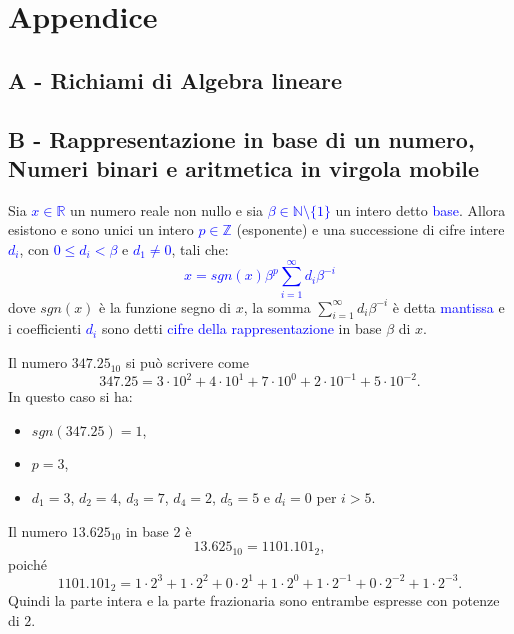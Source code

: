 \chapter*{Appendice}
{}

\section*{\textbf{A -} Richiami di Algebra lineare}

\section*{\textbf{B -} Rappresentazione in base di un numero, Numeri binari e aritmetica in virgola mobile}

\begin{defi}
Sia \textcolor{blue}{$x \in \mathbb{R}$} un numero reale non nullo e sia \textcolor{blue}{$\beta \in \mathbb{N}\setminus\{1\}$} un intero detto \textcolor{blue}{base}.
Allora esistono e sono unici un intero \textcolor{blue}{$p \in \mathbb{Z}$} (esponente) e una successione di cifre intere \textcolor{blue}{$d_i$},
con \textcolor{blue}{$0 \leq d_i < \beta$} e \textcolor{blue}{$d_1 \neq 0$}, tali che:
\textcolor{blue}{\[
x = sgn(x) \beta^p \sum_{i=1}^{\infty} d_i \beta^{-i}
\]}
dove $sgn(x)$ è la funzione segno di $x$, la somma $\sum_{i=1}^{\infty} d_i \beta^{-i}$ è detta 
\textcolor{blue}{mantissa} e i coefficienti \textcolor{blue}{$d_i$} sono detti
\textcolor{blue}{cifre della rappresentazione} in base $\beta$ di $x$.
\end{defi}

\begin{example}
Il numero $347.25_{10}$ si può scrivere come
\[
347.25 = 3 \cdot 10^2 + 4 \cdot 10^1 + 7 \cdot 10^0 + 2 \cdot 10^{-1} + 5 \cdot 10^{-2}.
\]
In questo caso si ha:
\begin{itemize}
    \item $sgn(347.25) = 1$,
    \item $p = 3$,
    \item $d_1 = 3$, $d_2 = 4$, $d_3 = 7$, $d_4 = 2$, $d_5 = 5$ e $d_i = 0$ per $i > 5$.
\end{itemize}
\end{example}

\begin{example}
Il numero $13.625_{10}$ in base 2 è
\[
13.625_{10} = 1101.101_2,
\]
poiché
\[
1101.101_2 = 1\cdot2^3 + 1\cdot2^2 + 0\cdot2^1 + 1\cdot2^0 + 1\cdot2^{-1} + 0\cdot2^{-2} + 1\cdot2^{-3}.
\]
Quindi la parte intera e la parte frazionaria sono entrambe espresse con potenze di $2$.
\end{example}

